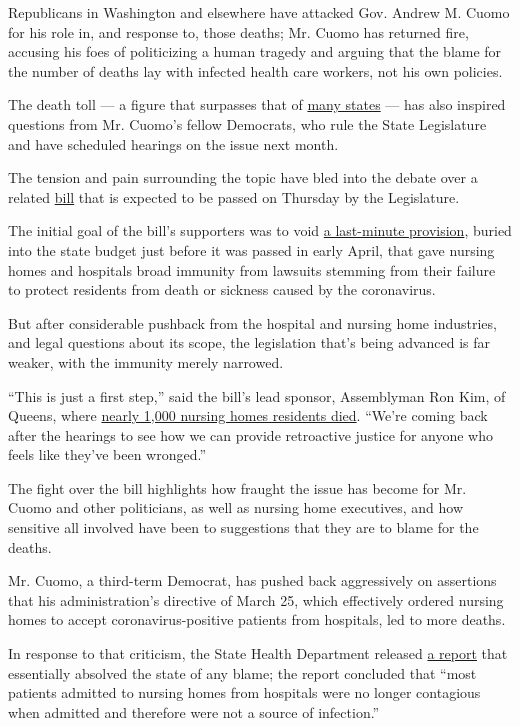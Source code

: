 Republicans in Washington and elsewhere have attacked Gov. Andrew M.
Cuomo for his role in, and response to, those deaths; Mr. Cuomo has
returned fire, accusing his foes of politicizing a human tragedy and
arguing that the blame for the number of deaths lay with infected health
care workers, not his own policies.

The death toll --- a figure that surpasses that of
\href{https://www.cdc.gov/covid-data-tracker/\#cases}{many states} ---
has also inspired questions from Mr. Cuomo's fellow Democrats, who rule
the State Legislature and have scheduled hearings on the issue next
month.

The tension and pain surrounding the topic have bled into the debate
over a related
\href{https://www.nysenate.gov/legislation/bills/2019/S8835}{bill} that
is expected to be passed on Thursday by the Legislature.

The initial goal of the bill's supporters was to void
\href{https://www.nytimes.com/2020/05/13/nyregion/nursing-homes-coronavirus-new-york.html}{a
last-minute provision}, buried into the state budget just before it was
passed in early April, that gave nursing homes and hospitals broad
immunity from lawsuits stemming from their failure to protect residents
from death or sickness caused by the coronavirus.

But after considerable pushback from the hospital and nursing home
industries, and legal questions about its scope, the legislation that's
being advanced is far weaker, with the immunity merely narrowed.

``This is just a first step,'' said the bill's lead sponsor, Assemblyman
Ron Kim, of Queens, where
\href{https://www.health.ny.gov/statistics/diseases/covid-19/fatalities_nursing_home_acf.pdf}{nearly
1,000 nursing homes residents died}. ``We're coming back after the
hearings to see how we can provide retroactive justice for anyone who
feels like they've been wronged.''

The fight over the bill highlights how fraught the issue has become for
Mr. Cuomo and other politicians, as well as nursing home executives, and
how sensitive all involved have been to suggestions that they are to
blame for the deaths.

Mr. Cuomo, a third-term Democrat, has pushed back aggressively on
assertions that his administration's directive of March 25, which
effectively ordered nursing homes to accept coronavirus-positive
patients from hospitals, led to more deaths.

In response to that criticism, the State Health Department released
\href{https://health.ny.gov/press/releases/2020/docs/nh_factors_report.pdf}{a
report} that essentially absolved the state of any blame; the report
concluded that ``most patients admitted to nursing homes from hospitals
were no longer contagious when admitted and therefore were not a source
of infection.''

